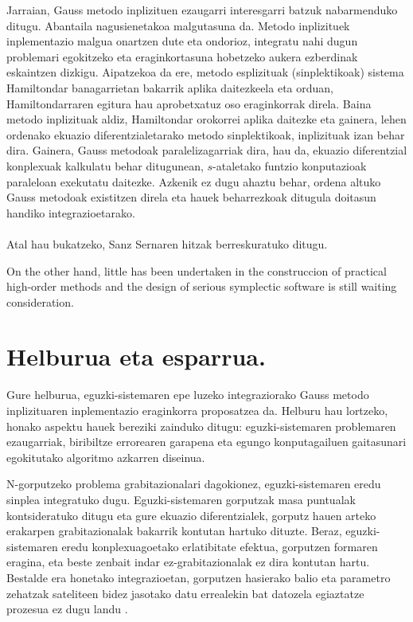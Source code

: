 Jarraian, Gauss metodo inplizituen ezaugarri interesgarri batzuk nabarmenduko ditugu. Abantaila nagusienetakoa malgutasuna da.  Metodo inplizituek inplementazio malgua onartzen dute eta ondorioz, integratu nahi dugun problemari egokitzeko eta eraginkortasuna hobetzeko aukera ezberdinak eskaintzen dizkigu. Aipatzekoa da ere, metodo esplizituak (sinplektikoak) sistema Hamiltondar banagarrietan bakarrik aplika daitezkeela eta orduan, Hamiltondarraren egitura hau aprobetxatuz oso eraginkorrak direla. Baina metodo inplizituak aldiz, Hamiltondar orokorrei aplika daitezke eta gainera, lehen ordenako ekuazio diferentzialetarako  metodo sinplektikoak, inplizituak izan behar dira. Gainera, Gauss metodoak paralelizagarriak dira, hau da, ekuazio diferentzial konplexuak kalkulatu behar ditugunean, $s$-ataletako funtzio konputazioak paraleloan exekutatu daitezke. Azkenik ez dugu ahaztu behar, ordena altuko Gauss metodoak existitzen direla  eta hauek beharrezkoak ditugula doitasun handiko integrazioetarako.     

\paragraph*{}Atal hau bukatzeko, Sanz Sernaren   hitzak berreskuratuko ditugu. 
\begin{displayquote}
On the other hand, little has been undertaken in the construccion of practical high-order methods and the design of serious symplectic software is still waiting consideration.
\end{displayquote}

\section{Helburua eta esparrua.}

Gure helburua, eguzki-sistemaren epe luzeko integraziorako Gauss metodo inplizituaren inplementazio eraginkorra proposatzea da. Helburu hau lortzeko, honako aspektu hauek bereziki zainduko ditugu: eguzki-sistemaren problemaren ezaugarriak, biribiltze errorearen garapena eta egungo konputagailuen gaitasunari egokitutako algoritmo azkarren diseinua.  

N-gorputzeko problema grabitazionalari dagokionez, eguzki-sistemaren eredu sinplea integratuko dugu. Eguzki-sistemaren gorputzak masa puntualak kontsideratuko ditugu eta gure ekuazio diferentzialek, gorputz hauen arteko erakarpen grabitazionalak bakarrik kontutan hartuko dituzte. Beraz, eguzki-sistemaren eredu konplexuagoetako erlatibitate efektua, gorputzen formaren eragina, eta beste zenbait indar ez-grabitazionalak ez dira kontutan hartu.
Bestalde era honetako integrazioetan, gorputzen hasierako balio eta parametro zehatzak sateliteen bidez jasotako datu errealekin bat datozela egiaztatze prozesua ez dugu landu \cite{Laskar2015}.

